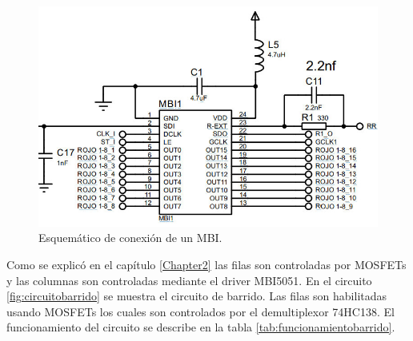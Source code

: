 \begin{figure}[htpb]
	\centering
    \includegraphics[scale=0.4]{Figures/circuitombi.jpg} 
	\caption{Esquemático de conexión de un MBI.}
	\label{fig:circuitombi}
\end{figure}



Como se explicó en el capítulo \ref{Chapter2} las filas son controladas por MOSFETs y las columnas son controladas mediante el driver MBI5051. En el circuito \ref{fig:circuitobarrido} se muestra el circuito de barrido. Las filas son habilitadas usando MOSFETs los cuales son controlados por el demultiplexor 74HC138. El funcionamiento del circuito se describe en la tabla \ref{tab:funcionamientobarrido}.

